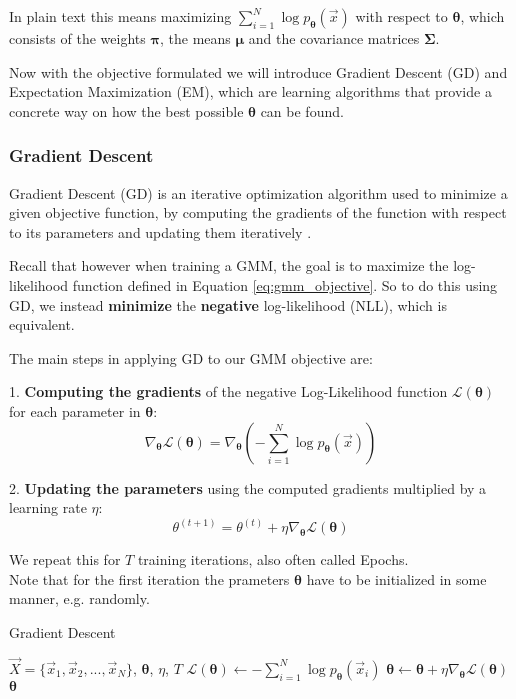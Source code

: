 In plain text this means maximizing $\sum_{i=1}^{N} \log p_{\boldsymbol{\theta}}(\vec x)$ with respect to $\boldsymbol{\theta}$, which consists of the weights $\boldsymbol \pi$, the means $\boldsymbol \mu$ and the covariance matrices $\boldsymbol \Sigma$.

Now with the objective formulated we will introduce Gradient Descent (GD) and Expectation Maximization (EM), which are learning algorithms
that provide a concrete way on how the best possible $\boldsymbol{\theta}$ can be found. 

\subsubsection{Gradient Descent}
\label{sec:gmm_sgd}

Gradient Descent (GD) is an iterative optimization algorithm used to minimize a given objective function, by  
computing the gradients of the function with respect to its parameters and updating them iteratively \cite{deepl}.

Recall that however when training a GMM, the goal is to maximize the log-likelihood function defined in Equation \ref{eq:gmm_objective}. 
So to do this using GD, we instead \textbf{minimize} the \textbf{negative} log-likelihood (NLL), which is equivalent.

The main steps in applying GD to our GMM objective are: 

1. \textbf{Computing the gradients} of the negative Log-Likelihood function $\mathcal{L}(\boldsymbol{\theta})$ for each parameter in $\boldsymbol{\theta}$: 
\[
    \nabla_{\boldsymbol{\theta}} \mathcal{L}(\boldsymbol{\theta}) = \nabla_{\boldsymbol{\theta}} (- \sum_{i=1}^{N} \log p_{\boldsymbol{\theta}}(\vec x))
\]

2. \textbf{Updating the parameters} using the computed gradients multiplied by a learning rate $\eta$:
\[
\theta^{(t+1)} = \theta^{(t)} + \eta \nabla_{\boldsymbol{\theta}} \mathcal{L}(\boldsymbol{\theta})
\]

We repeat this for $T$ training iterations, also often called Epochs. \\
Note that for the first iteration the prameters $\boldsymbol{\theta}$ have to be initialized in some manner, e.g. randomly. 

\begin{algorithm}
    \caption{Gradient Descent}
    \label{alg:gd_gmm}
    \begin{algorithmic}[1]  
        \Require $\vec X = \{\vec x_1, \vec x_2, ..., \vec x_N\}$, $\boldsymbol{\theta}$, $\eta$, $T$
            \State $\mathcal{L}(\boldsymbol{\theta}) \gets - \sum_{i=1}^{N} \log p_{\boldsymbol{\theta}}(\vec x_i)$
            \State $\boldsymbol{\theta} \gets \boldsymbol{\theta} + \eta \nabla_{\boldsymbol{\theta}} \mathcal{L}(\boldsymbol{\theta})$
        \EndFor
        \State \Return $\boldsymbol{\theta}$
    \end{algorithmic}
\end{algorithm}

